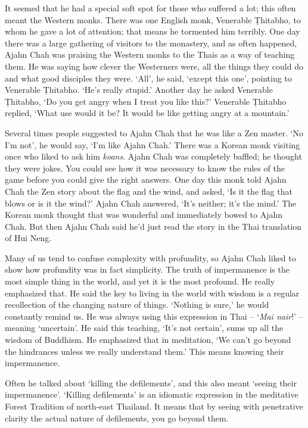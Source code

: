 It seemed that he had a special soft spot for those who suffered a lot; 
this often meant the Western monks. There was one English monk, 
Venerable Ṭhitabho, to whom he gave a lot of attention; that means he
tormented him terribly. One day there was a large gathering of visitors
to the monastery, and as often happened, Ajahn Chah was praising the
Western monks to the Thais as a way of teaching them. He was saying how
clever the Westerners were, all the things they could do and what good
disciples they were. `All', he said, `except this one', pointing to
Venerable Ṭhitabho. `He's really stupid.' Another day he asked Venerable
Ṭhitabho, `Do you get angry when I treat you like this?' Venerable
Ṭhitabho replied, `What use would it be? It would be like getting angry
at a mountain.'

Several times people suggested to Ajahn Chah that he was like a Zen
master. `No I'm not', he would say, `I'm like Ajahn Chah.' There was a
Korean monk visiting once who liked to ask him \emph{koans}. Ajahn Chah
was completely baffled; he thought they were jokes. You could see how it
was necessary to know the rules of the game before you could give the
right answers. One day this monk told Ajahn Chah the Zen story about the
flag and the wind, and asked, `Is it the flag that blows or is it the
wind?' Ajahn Chah answered, `It's neither; it's the mind.' The Korean
monk thought that was wonderful and immediately bowed to Ajahn Chah. But
then Ajahn Chah said he'd just read the story in the Thai translation of
Hui Neng. 

Many of us tend to confuse complexity with profundity, so Ajahn Chah
liked to show how profundity was in fact simplicity. The truth of
impermanence is the most simple thing in the world, and yet it is the
most profound. He really emphasized that. He said the key to living in
the world with wisdom is a regular recollection of the changing nature
of things. `Nothing is sure,' he would constantly remind us. He was
always using this expression in Thai -- `\emph{Mai nair}!' -- meaning
`uncertain'. He said this teaching, `It's not certain', sums up all the
wisdom of Buddhism. He emphasized that in meditation, `We can't go
beyond the hindrances unless we really understand them.' This means
knowing their impermanence. 

Often he talked about `killing the defilements', and this also meant
`seeing their impermanence'. `Killing defilements' is an idiomatic
expression in the meditative Forest Tradition of north-east Thailand. It
means that by seeing with penetrative clarity the actual nature of
defilements, you go beyond them. 

